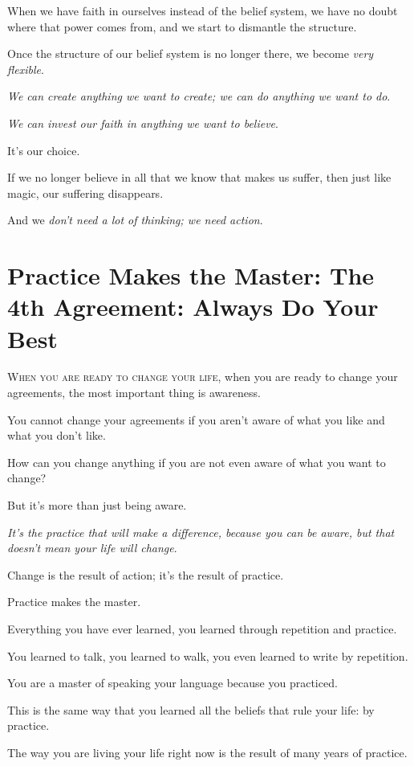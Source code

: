 \documentclass{article}
\numberwithin{equation}{section}
\begin{document}
When we have faith in ourselves instead of the belief system, we have no doubt where that power comes from, and we start to dismantle the structure.

%
Once the structure of our belief system is no longer there, we become \textit{very flexible}.

\textit{We can create anything we want to create; we can do anything we want to do}.

\textit{We can invest our faith in anything we want to believe}.

It's our choice.

If we no longer believe in all that we know that makes us suffer, then just like magic, our suffering disappears.

And we \textit{don't need a lot of thinking; we need action}.



\section{Practice Makes the Master: The 4th Agreement: Always Do Your Best}
\textsc{When you are ready to change your life}, when you are ready to change your agreements, the most important thing is awareness.

You cannot change your agreements if you aren't aware of what you like and what you don't like.

How can you change anything if you are not even aware of what you want to change?

But it's more than just being aware.

\textit{It's the practice that will make a difference, because you can be aware, but that doesn't mean your life will change}.

Change is the result of action; it's the result of practice.

Practice makes the master.

Everything you have ever learned, you learned through repetition and practice.

You learned to talk, you learned to walk, you even learned to write by repetition.

You are a master of speaking your language because you practiced.

This is the same way that you learned all the beliefs that rule your life: by practice.

The way you are living your life right now is the result of many years of practice.
\end{document}
